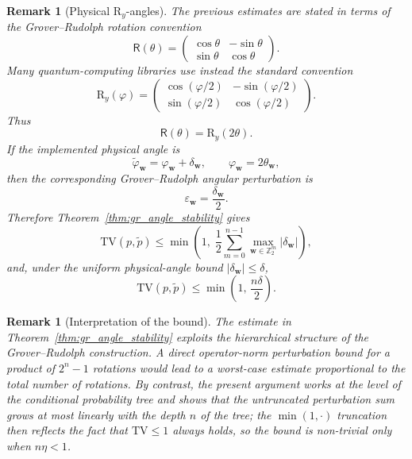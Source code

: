 \documentclass{article}
\newtheorem{remark}[theorem]{Remark}
\newcommand{\rR}{\mathsf{R}}
\newcommand{\RY}{\mathrm{R}_y}
\numberwithin{equation}{section}
\begin{document}
\begin{remark}[Physical \(\RY\)-angles]
\label{rem:physical_RY_angles}
The previous estimates are stated in terms of the Grover--Rudolph
rotation convention
\[
\rR(\theta)
=
\begin{pmatrix}
\cos\theta&-\sin\theta\\
\sin\theta&\cos\theta
\end{pmatrix}.
\]
Many quantum-computing libraries use instead the standard convention
\[
\RY(\varphi)
=
\begin{pmatrix}
\cos(\varphi/2)&-\sin(\varphi/2)\\
\sin(\varphi/2)&\cos(\varphi/2)
\end{pmatrix}.
\]
Thus
\[
\rR(\theta)=\RY(2\theta).
\]
If the implemented physical angle is
\[
\widetilde\varphi_{\mathbf w}
=
\varphi_{\mathbf w}
+
\delta_{\mathbf w},
\qquad
\varphi_{\mathbf w}=2\theta_{\mathbf w},
\]
then the corresponding Grover--Rudolph angular perturbation is
\[
\varepsilon_{\mathbf w}
=
\frac{\delta_{\mathbf w}}{2}.
\]
Therefore Theorem~\ref{thm:gr_angle_stability} gives
\[
\mathrm{TV}(p,\widetilde p)
\le
\min\!\left(1,\;
\frac12
\sum_{m=0}^{n-1}
\max_{\mathbf w\in\mathbb Z_2^m}
|\delta_{\mathbf w}|\right),
\]
and, under the uniform physical-angle bound
\(|\delta_{\mathbf w}|\le\delta\),
\[
\mathrm{TV}(p,\widetilde p)
\le
\min\!\left(1,\,\frac{n\delta}{2}\right).
\]
\end{remark}

\begin{remark}[Interpretation of the bound]
\label{rem:stability_interpretation}
The estimate in Theorem~\ref{thm:gr_angle_stability} exploits the
hierarchical structure of the Grover--Rudolph construction. A direct
operator-norm perturbation bound for a product of \(2^n-1\) rotations
would lead to a worst-case estimate proportional to the total number of
rotations. By contrast, the present argument works at the level of the
conditional probability tree and shows that the untruncated perturbation
sum grows at most linearly with the depth \(n\) of the tree; the
\(\min(1,\cdot)\) truncation then reflects the fact that
\(\mathrm{TV}\le 1\) always holds, so the bound is non-trivial only when
\(n\eta<1\).
\end{remark}


\end{document}
